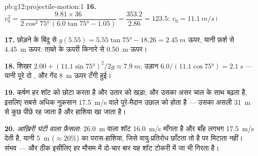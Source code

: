 \begin{solution}{pb:g12:projectile-motion:1}
\textbf{16.} $v_0^2 = \dfrac{9.81 \times 36}{2\cos^2\ang{75}\,
(6.0\tan\ang{75} - 1.05)} = \dfrac{353.2}{2.86} = 123.5$: $v_0 = \qty{11.1}{m/s}$।

\textbf{17.} छोड़ने के बिंदु से $y(5.55) = 5.55\tan\ang{75} - 18.26 = \qty{2.45}{m}$ ऊपर, यानी फ़र्श से \qty{4.45}{m} ऊपर: तख़्ते
के ऊपरी किनारे से \qty{0.50}{m} ऊपर।

\textbf{18.} शिखर $2.00 + (11.1\sin\ang{75})^2/2g \approx
\qty{7.9}{m}$; उड़ान $6.0/(11.1\cos\ang{75}) = \qty{2.1}{s}$ --- यानी पूरे दो , और गेंद
\qty{8}{m} ऊपर टँगी हुई।

\textbf{19.} कर्षण हर शॉट को छोटा करता है और उतार को खड़ा; और उसका असर चाल के
साथ बढ़ता है, इसलिए सबसे अधिक नुक़सान \qty{17.5}{m/s} वाले पूरे-मैदान उछाल को होता है
--- उसका असली  \qty{31}{m} से कुछ  पीछे रह जाता है और हाशिया खा
जाता है।

\textbf{20.} \emph{आख़िरी घंटी वाला फ़ैसला}: \qty{26.0}{m} वाला शॉट \qty{16.0}{m/s} माँगता
है और बाँह लगभग \qty{17.5}{m/s} देती है, यानी \qty{5}{m} ($\approx 20\%$) का परास-हाशिया,
जिसे वायु-प्रतिरोध छाँटता तो है पर मिटाता नहीं। संभव --- और ठीक इसीलिए हर
मौसम में दो-चार बार यह शॉट टोकरी में जा भी गिरता है।
\end{solution}
